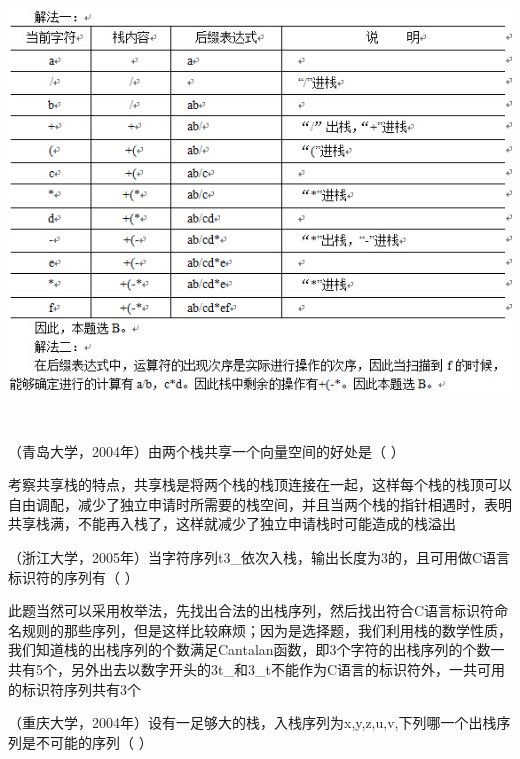 \begin{solution}\includegraphics[width=5.91667in,height=4.58333in]{computerassets/22df861753f52f7f3ea6cf28d4a51d95.jpeg}
\end{solution}
\question （青岛大学，2004年）由两个栈共享一个向量空间的好处是（ ）
\par{}
\begin{solution}考察共享栈的特点，共享栈是将两个栈的栈顶连接在一起，这样每个栈的栈顶可以自由调配，减少了独立申请时所需要的栈空间，并且当两个栈的指针相遇时，表明共享栈满，不能再入栈了，这样就减少了独立申请栈时可能造成的栈溢出
\end{solution}
\question （浙江大学，2005年）当字符序列t3\_依次入栈，输出长度为3的，且可用做C语言标识符的序列有（
）
\par{}
\begin{solution}此题当然可以采用枚举法，先找出合法的出栈序列，然后找出符合C语言标识符命名规则的那些序列，但是这样比较麻烦；因为是选择题，我们利用栈的数学性质，我们知道栈的出栈序列的个数满足Cantalan函数，即3个字符的出栈序列的个数一共有5个，另外出去以数字开头的3t\_和3\_t不能作为C语言的标识符外，一共可用的标识符序列共有3个
\end{solution}
\question （重庆大学，2004年）设有一足够大的栈，入栈序列为x,y,z,u,v,下列哪一个出栈序列是不可能的序列（
）
\par{}
